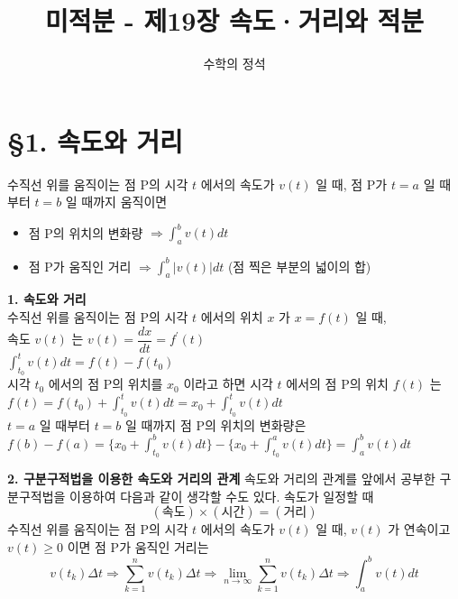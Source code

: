 \documentclass[a4paper,11pt]{article}
\title{\textbf{미적분 - 제19장 속도·거리와 적분}}
\author{수학의 정석}
\date{}
\begin{document}
\maketitle

\section*{§1. 속도와 거리}

\begin{conceptbox}[기본 정석 - 속도와 거리]
수직선 위를 움직이는 점 P의 시각 $t$ 에서의 속도가 $v(t)$ 일 때, 점 P가 $t=a$ 일 때부터 $t=b$ 일 때까지 움직이면
\begin{itemize}
    \item 점 P의 위치의 변화량 $\Rightarrow \int_{a}^{b} v(t) dt$
    \item 점 P가 움직인 거리 $\Rightarrow \int_{a}^{b} |v(t)| dt$ (점 찍은 부분의 넓이의 합)
\end{itemize}
\end{conceptbox}

\begin{advicebox}
\textbf{1. 속도와 거리} \\
수직선 위를 움직이는 점 P의 시각 $t$ 에서의 위치 $x$ 가 $x=f(t)$ 일 때,\\
 속도 $v(t)$ 는 $v(t) = \dfrac{dx}{dt} = f^{\prime}(t)$\\
$\int_{t_{0}}^{t} v(t) dt = f(t) - f(t_{0})$\\
시각 $t_{0}$ 에서의 점 P의 위치를 $x_{0}$ 이라고 하면 시각 $t$ 에서의 점 P의 위치 $f(t)$ 는\\
$f(t) = f(t_{0}) + \int_{t_{0}}^{t} v(t) dt = x_{0} + \int_{t_{0}}^{t} v(t) dt$\\
$t=a$ 일 때부터 $t=b$ 일 때까지 점 P의 위치의 변화량은\\
$f(b) - f(a) = \{x_{0} + \int_{t_{0}}^{b} v(t) dt\} - \{x_{0} + \int_{t_{0}}^{a} v(t) dt\} = \int_{a}^{b} v(t) dt$
\end{advicebox}

\begin{advicebox}
\textbf{2. 구분구적법을 이용한 속도와 거리의 관계} 
속도와 거리의 관계를 앞에서 공부한 구분구적법을 이용하여 다음과 같이 생각할 수도 있다. 속도가 일정할 때
\[ (\text{속도}) \times (\text{시간}) = (\text{거리}) \]
수직선 위를 움직이는 점 P의 시각 $t$ 에서의 속도가 $v(t)$ 일 때, $v(t)$ 가 연속이고 $v(t) \ge 0$ 이면 점 P가 움직인 거리는 
\[ v(t_k) \Delta t \Rightarrow \sum_{k=1}^{n} v(t_k) \Delta t \Rightarrow \lim_{n \to \infty} \sum_{k=1}^{n} v(t_k) \Delta t \Rightarrow \int_{a}^{b} v(t) dt \]
\end{advicebox}
\end{document}
